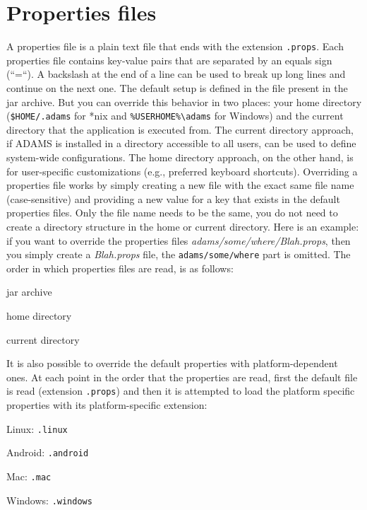 \section{Properties files}
A properties file is a plain text file that ends with the extension
\texttt{.props}. Each properties file contains key-value pairs that are
separated by an equals sign (``=``). A backslash at the end of a line can be
used to break up long lines and continue on the next one. The default setup is
defined in the file present in the jar archive. But you can override this
behavior in two places:
your home directory (\texttt{\$HOME/.adams} for *nix and
\texttt{\%USERHOME\%\textbackslash adams} for Windows) and the current directory
that the application is executed from. The current directory approach, if ADAMS
is installed in a directory accessible to all users, can be used to define
system-wide configurations. The home directory approach, on the other hand, is
for user-specific customizations (e.g., preferred keyboard shortcuts).
Overriding a properties file works by simply creating a new file with the exact
same file name (case-sensitive) and providing a new value for a key that exists
in the default properties files. Only the file name needs to be the same, you do
not need to create a directory structure in the home or current directory.
Here is an example: if you want to override the properties files
\textit{adams/some/where/Blah.props}, then you simply create a
\textit{Blah.props} file, the \texttt{adams/some/where} part is omitted.
The order in which properties files are read, is as follows:
\begin{tight_enumerate}
	\item jar archive
	\item home directory
	\item current directory
\end{tight_enumerate}
It is also possible to override the default properties with platform-dependent
ones. At each point in the order that the properties are read, first the
default file is read (extension \texttt{.props}) and then it is attempted
to load the platform specific properties with its platform-specific extension:
\begin{tight_enumerate}
	\item Linux: \texttt{.linux}
	\item Android: \texttt{.android}
	\item Mac: \texttt{.mac}
	\item Windows: \texttt{.windows}
\end{tight_enumerate}

